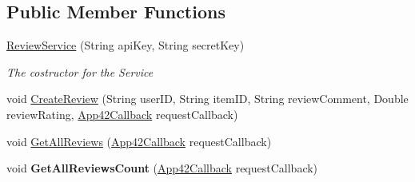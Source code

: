 \subsection*{Public Member Functions}
\begin{DoxyCompactItemize}
\item 
\hyperlink{classcom_1_1shephertz_1_1app42_1_1paas_1_1sdk_1_1windows_1_1review_1_1_review_service_ae33d1f1e24483ae60e3603c9ae260cf8}{Review\+Service} (String api\+Key, String secret\+Key)
\begin{DoxyCompactList}\small\item\em The costructor for the Service \end{DoxyCompactList}\item 
void \hyperlink{classcom_1_1shephertz_1_1app42_1_1paas_1_1sdk_1_1windows_1_1review_1_1_review_service_a7baf749064f8fd7f09d72cc483a6bfe0}{Create\+Review} (String user\+I\+D, String item\+I\+D, String review\+Comment, Double review\+Rating, \hyperlink{interfacecom_1_1shephertz_1_1app42_1_1paas_1_1sdk_1_1windows_1_1_app42_callback}{App42\+Callback} request\+Callback)
\item 
void \hyperlink{classcom_1_1shephertz_1_1app42_1_1paas_1_1sdk_1_1windows_1_1review_1_1_review_service_af33c24779bcfb940cf54bfa2d92f8065}{Get\+All\+Reviews} (\hyperlink{interfacecom_1_1shephertz_1_1app42_1_1paas_1_1sdk_1_1windows_1_1_app42_callback}{App42\+Callback} request\+Callback)
\item 
\hypertarget{classcom_1_1shephertz_1_1app42_1_1paas_1_1sdk_1_1windows_1_1review_1_1_review_service_a5920787f15cbbd02f299e34547cf61b7}{void {\bfseries Get\+All\+Reviews\+Count} (\hyperlink{interfacecom_1_1shephertz_1_1app42_1_1paas_1_1sdk_1_1windows_1_1_app42_callback}{App42\+Callback} request\+Callback)}\label{classcom_1_1shephertz_1_1app42_1_1paas_1_1sdk_1_1windows_1_1review_1_1_review_service_a5920787f15cbbd02f299e34547cf61b7}


\end{DoxyCompactItemize}
